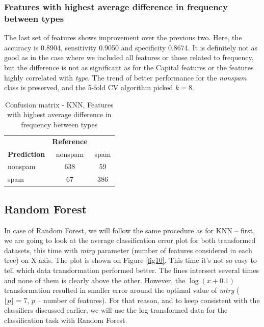 \documentclass{article}\usepackage[]{graphicx}\usepackage[]{xcolor}
\begin{document}
\subsubsection*{Features with highest average difference in frequency between types}

The last set of features shows improvement over the previous two. Here, the accuracy is 0.8904,
sensitivity 0.9050 and specificity 0.8674. It is definitely not as good as in the case 
where we included all features or those related to frequency, but the difference is
not as significant as for the Capital features or the features highly correlated with \textit{type}.
The trend of better performance for the \textit{nonspam} class is preserved, and the 5-fold CV algorithm picked $k=8$.

\begin{table}[h]
    \centering
    \begin{tabular}{lcc}
        & \textbf{Reference} & \\
        \textbf{Prediction} & nonspam & spam \\
        nonspam & 638 & 59 \\
        spam & 67 & 386 \\
    \end{tabular}
    \caption{Confusion matrix - KNN, Features with highest average difference in frequency between types}
    \label{KNNcm5}
\end{table}

\subsection*{Random Forest}

In case of Random Forest, we will follow the same procedure as for KNN -- first, 
we are going to look at the average classification error plot for both transformed
datasets, this time with \textit{mtry} parameter (number of features considered in each tree) on X-axis. 
The plot is shown on Figure \ref{fig10}. This time it's not so easy to tell which data transformation
performed better. The lines intersect several times and none of them is clearly above the other.
However, the $\log(x+0.1)$ transformation resulted in smaller error around the
optimal value of \textit{mtry} ($\lfloor p \rfloor = 7$, $p$ -- number of features).
For that reason, and to keep consistent with the classifiers discussed earlier, 
we will use the log-transformed data for the classification task with Random Forest.
\end{document}
